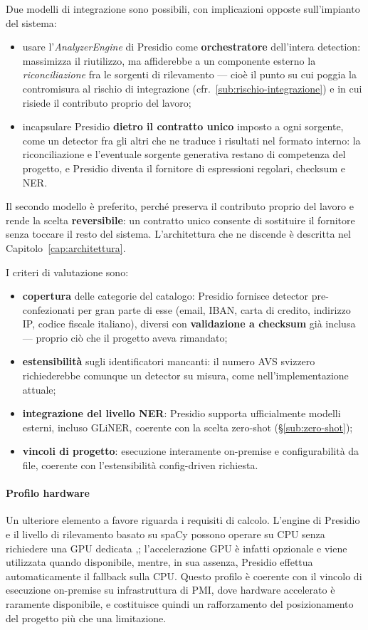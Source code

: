 Due modelli di integrazione sono possibili, con implicazioni opposte sull'impianto del sistema:
\begin{itemize}
	\item usare l'\textit{AnalyzerEngine} di Presidio come \textbf{orchestratore} dell'intera detection: massimizza il riutilizzo, ma affiderebbe a un componente esterno la \emph{riconciliazione} fra le sorgenti di rilevamento --- cioè il punto su cui poggia la contromisura al rischio di integrazione (cfr.~\ref{sub:rischio-integrazione}) e in cui risiede il contributo proprio del lavoro;
	\item incapsulare Presidio \textbf{dietro il contratto unico} imposto a ogni sorgente, come un detector fra gli altri che ne traduce i risultati nel formato interno: la riconciliazione e l'eventuale sorgente generativa restano di competenza del progetto, e Presidio diventa il fornitore di espressioni regolari, checksum e NER.
\end{itemize}
Il secondo modello è preferito, perché preserva il contributo proprio del lavoro e rende la scelta \textbf{reversibile}: un contratto unico consente di sostituire il fornitore senza toccare il resto del sistema. L'architettura che ne discende è descritta nel Capitolo~\ref{cap:architettura}.

I criteri di valutazione sono:
\begin{itemize}
	\item \textbf{copertura} delle categorie del catalogo: Presidio fornisce detector pre-confezionati per gran parte di esse (email, IBAN, carta di credito, indirizzo IP, codice fiscale italiano), diversi con \textbf{validazione a checksum} già inclusa --- proprio ciò che il progetto aveva rimandato;
	\item \textbf{estensibilità} sugli identificatori mancanti: il numero AVS svizzero richiederebbe comunque un detector su misura, come nell'implementazione attuale;
	\item \textbf{integrazione del livello NER}: Presidio supporta ufficialmente modelli esterni, incluso GLiNER, coerente con la scelta zero-shot (§\ref{sub:zero-shot});
	\item \textbf{vincoli di progetto}: esecuzione interamente on-premise e configurabilità da file, coerente con l'estensibilità config-driven richiesta.
\end{itemize}

\paragraph*{Profilo hardware} Un ulteriore elemento a favore riguarda i requisiti di calcolo. L'engine di Presidio e il livello di rilevamento basato su spaCy possono operare su CPU senza richiedere una GPU dedicata {\cite{FactsFiguresSpaCy},\cite{GPUAccelerationPresidio}}; l'accelerazione GPU è infatti opzionale e viene utilizzata quando disponibile, mentre, in sua assenza, Presidio effettua automaticamente il fallback sulla CPU. Questo profilo è coerente con il vincolo di esecuzione on-premise su infrastruttura di PMI, dove hardware accelerato è raramente disponibile, e costituisce quindi un rafforzamento del posizionamento del progetto più che una limitazione.

